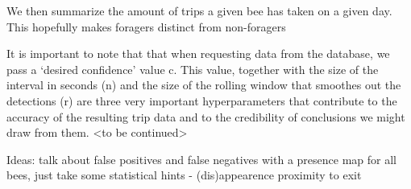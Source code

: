 We then summarize the amount of trips a given bee has taken on a given day. This
hopefully makes foragers distinct from non-foragers 

It is important to note that that when requesting data from the database, we
pass a ‘desired confidence’ value c. This value, together with the size of the
interval in seconds (n) and the size of the rolling window that smoothes out the
detections (r) are three very important hyperparameters that contribute to the
accuracy of the resulting trip data and to the credibility of conclusions we
might draw from them.  <to be continued>

Ideas: talk about false positives and false negatives with a presence map for
all bees, just take some statistical hints - %
(dis)appearence proximity to exit 
